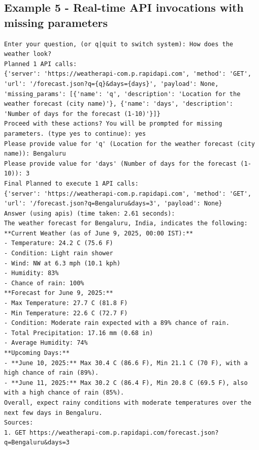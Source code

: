\documentclass[default]{sn-jnl}%
\begin{document}
\subsection*{Example 5 - Real-time API invocations with missing parameters}
\begin{lstlisting}[basicstyle=\ttfamily\small, frame=single, breaklines=true]
Enter your question, (or q|quit to switch system): How does the weather look?
Planned 1 API calls:
{'server': 'https://weatherapi-com.p.rapidapi.com', 'method': 'GET', 'url': '/forecast.json?q={q}&days={days}', 'payload': None, 'missing_params': [{'name': 'q', 'description': 'Location for the weather forecast (city name)'}, {'name': 'days', 'description': 'Number of days for the forecast (1-10)'}]}
Proceed with these actions? You will be prompted for missing parameters. (type yes to continue): yes
Please provide value for 'q' (Location for the weather forecast (city name)): Bengaluru
Please provide value for 'days' (Number of days for the forecast (1-10)): 3
Final Planned to execute 1 API calls:
{'server': 'https://weatherapi-com.p.rapidapi.com', 'method': 'GET', 'url': '/forecast.json?q=Bengaluru&days=3', 'payload': None}
Answer (using apis) (time taken: 2.61 seconds):
The weather forecast for Bengaluru, India, indicates the following:
**Current Weather (as of June 9, 2025, 00:00 IST):**
- Temperature: 24.2 C (75.6 F)
- Condition: Light rain shower
- Wind: NW at 6.3 mph (10.1 kph)
- Humidity: 83%
- Chance of rain: 100%
**Forecast for June 9, 2025:**
- Max Temperature: 27.7 C (81.8 F)
- Min Temperature: 22.6 C (72.7 F)
- Condition: Moderate rain expected with a 89% chance of rain.
- Total Precipitation: 17.16 mm (0.68 in)
- Average Humidity: 74%
**Upcoming Days:**
- **June 10, 2025:** Max 30.4 C (86.6 F), Min 21.1 C (70 F), with a high chance of rain (89%).
- **June 11, 2025:** Max 30.2 C (86.4 F), Min 20.8 C (69.5 F), also with a high chance of rain (85%).
Overall, expect rainy conditions with moderate temperatures over the next few days in Bengaluru.
Sources:
1. GET https://weatherapi-com.p.rapidapi.com/forecast.json?q=Bengaluru&days=3 
\end{lstlisting}
\end{document}

